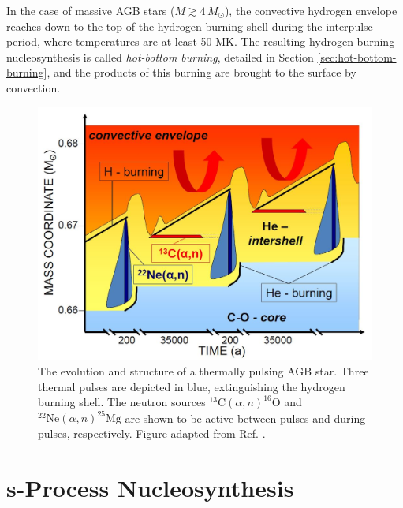 In the case of massive AGB stars ($M \gtrsim 4 \, M_{\odot}$), the convective hydrogen envelope reaches down to the top of the hydrogen-burning shell during the interpulse period, where temperatures are at least 50 MK. The resulting hydrogen burning nucleosynthesis is called \emph{hot-bottom burning}, detailed in Section \ref{sec:hot-bottom-burning}, and the products of this burning are brought to the surface by convection.

\begin{figure}[t]
\centering
\includegraphics[width=6.5in]{Chapter-1/figs/sProcess_AGB.JPG}
\caption{\label{fig:AGB_Structure}The evolution and structure of a thermally pulsing AGB star. Three thermal pulses are depicted in blue, extinguishing the hydrogen burning shell. The neutron sources $^{13}\mathrm{C}(\alpha,n)^{16}\mathrm{O}$ and $^{22}\mathrm{Ne}(\alpha,n)^{25}\mathrm{Mg}$ are shown to be active between pulses and during pulses, respectively. Figure adapted from Ref. \cite{Reifarth2014}.}
\end{figure}

\section{s-Process Nucleosynthesis} \label{sec:s-process}

